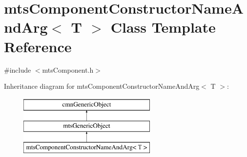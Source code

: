 \hypertarget{classmts_component_constructor_name_and_arg}{\section{mts\-Component\-Constructor\-Name\-And\-Arg$<$ T $>$ Class Template Reference}
\label{classmts_component_constructor_name_and_arg}
}


{\ttfamily \#include $<$mts\-Component.\-h$>$}

Inheritance diagram for mts\-Component\-Constructor\-Name\-And\-Arg$<$ T $>$\-:\begin{figure}[H]
\begin{center}
\leavevmode
\includegraphics[height=3.000000cm]{d5/dd4/classmts_component_constructor_name_and_arg}
\end{center}
\end{figure}
